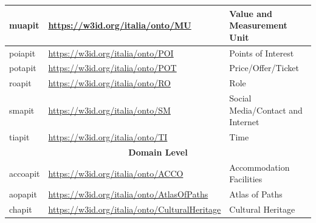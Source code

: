 \begin{longtable}[c]{lll}
  \multicolumn{1}{|p{0.2\textwidth}|}{muapit}        & \multicolumn{1}{p{0.4\textwidth}|}{\url{https://w3id.org/italia/onto/MU}}               & \multicolumn{1}{p{0.4\textwidth}|}{Value and Measurement Unit}                 \\ \hline
  \multicolumn{1}{|p{0.2\textwidth}|}{poiapit}       & \multicolumn{1}{p{0.4\textwidth}|}{\url{https://w3id.org/italia/onto/POI}}              & \multicolumn{1}{p{0.4\textwidth}|}{Points of Interest}                         \\ \hline
  \multicolumn{1}{|p{0.2\textwidth}|}{potapit}       & \multicolumn{1}{p{0.4\textwidth}|}{\url{https://w3id.org/italia/onto/POT}}              & \multicolumn{1}{p{0.4\textwidth}|}{Price/Offer/Ticket}                         \\ \hline
  \multicolumn{1}{|p{0.2\textwidth}|}{roapit}        & \multicolumn{1}{p{0.4\textwidth}|}{\url{https://w3id.org/italia/onto/RO}}               & \multicolumn{1}{p{0.4\textwidth}|}{Role}                                       \\ \hline
  \multicolumn{1}{|p{0.2\textwidth}|}{smapit}        & \multicolumn{1}{p{0.4\textwidth}|}{\url{https://w3id.org/italia/onto/SM}}               & \multicolumn{1}{p{0.4\textwidth}|}{Social Media/Contact and Internet}          \\ \hline
  \multicolumn{1}{|p{0.2\textwidth}|}{tiapit}        & \multicolumn{1}{p{0.4\textwidth}|}{\url{https://w3id.org/italia/onto/TI}}               & \multicolumn{1}{p{0.4\textwidth}|}{Time}                                       \\ \hline
  \multicolumn{3}{|c|}{\textbf{Domain Level}}                                                                                                                                \\ \hline
  \multicolumn{1}{|p{0.2\textwidth}|}{accoapit}      & \multicolumn{1}{p{0.4\textwidth}|}{\url{https://w3id.org/italia/onto/ACCO}}             & \multicolumn{1}{p{0.4\textwidth}|}{Accommodation Facilities}                   \\ \hline
  \multicolumn{1}{|p{0.2\textwidth}|}{aopapit}       & \multicolumn{1}{p{0.4\textwidth}|}{\url{https://w3id.org/italia/onto/AtlasOfPaths}}     & \multicolumn{1}{p{0.4\textwidth}|}{Atlas of Paths}                             \\ \hline
  \multicolumn{1}{|p{0.2\textwidth}|}{chapit}        & \multicolumn{1}{p{0.4\textwidth}|}{\url{https://w3id.org/italia/onto/CulturalHeritage}} & \multicolumn{1}{p{0.4\textwidth}|}{Cultural Heritage}                          \\ \hline

\end{longtable}
